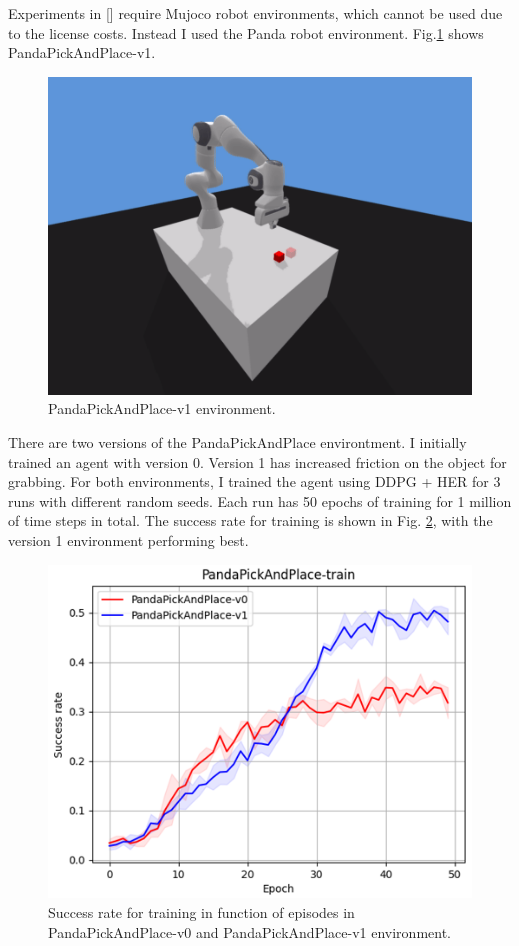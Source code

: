 \documentclass[conference]{IEEEtran}
\begin{document}
Experiments in [\cite{plappert2018multi}] require Mujoco robot environments, which cannot be used due to the license costs. Instead I used the Panda robot environment. Fig.\ref{fig:PandaPickAndPlace} shows PandaPickAndPlace-v1.
\begin{figure}[ht]
\centering
\includegraphics[width=0.6\columnwidth]{img/PandaPickAndPlace-v1.png}
\caption{PandaPickAndPlace-v1 environment.}
\label{fig:PandaPickAndPlace}
\end{figure}
There are two versions of the PandaPickAndPlace environtment. I initially trained an agent with version 0. Version 1 has increased friction on the object for grabbing. For both environments, I trained the agent using DDPG + HER for 3 runs with different random seeds. Each run has 50 epochs of training for 1 million of time steps in total. The success rate for training is shown in Fig. \ref{fig:exp_deep_train}, with the version 1 environment performing best.
\begin{figure}[ht]
\centering
\includegraphics[width=0.8\columnwidth]{img/exp_deep_train.png}
\caption{Success rate for training in function of episodes in PandaPickAndPlace-v0 and PandaPickAndPlace-v1 environment.}
\label{fig:exp_deep_train}
\end{figure}
\end{document}
